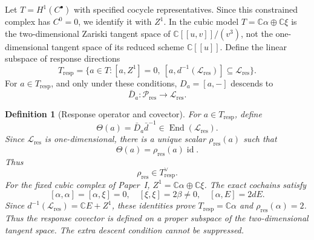 \documentclass[11pt]{amsart}
\newtheorem{definition}[theorem]{Definition}
\newcommand{\C}{\mathbb C}
\newcommand{\End}{\operatorname{End}}
\newcommand{\id}{\operatorname{id}}
\begin{document}
Let $T=H^1(C^\bullet)$ with specified cocycle representatives.
Since this constrained complex has $C^0=0$, we identify it with $Z^1$.
In the cubic model $T=\C\alpha\oplus\C\xi$ is the two-dimensional
Zariski tangent space of $\C[[u,v]]/(v^3)$, not the one-dimensional
tangent space of its reduced scheme $\C[[u]]$.
Define the linear subspace of response directions
\[
T_{\mathrm{resp}}=
\{a\in T:
[a,Z^1]=0,\ 
[a,d^{-1}(\mathcal L_{\mathrm{res}})]\subseteq\mathcal L_{\mathrm{res}}\}.
\]
For \(a\in T_{\mathrm{resp}}\), and only under these conditions, \(D_a=[a,-]\) descends to
\[
\bar D_a:\mathcal P_{\mathrm{res}}\longrightarrow\mathcal L_{\mathrm{res}}.
\]

\begin{definition}[Response operator and covector]
For \(a\in T_{\mathrm{resp}}\), define
\[
\Theta(a)=\bar D_a\bar d^{-1}
\in\End(\mathcal L_{\mathrm{res}}).
\]
Since \(\mathcal L_{\mathrm{res}}\) is one-dimensional, there is a unique scalar \(\rho_{\mathrm{res}}(a)\) such that
\[
\Theta(a)=\rho_{\mathrm{res}}(a)\id.
\]
Thus
\[
\rho_{\mathrm{res}}\in T_{\mathrm{resp}}^\vee.
\]
For the fixed cubic complex of Paper~I, \(Z^1=\C\alpha\oplus\C\xi\).
The exact cochains satisfy
\[
[\alpha,\alpha]=[\alpha,\xi]=0,\quad
[\xi,\xi]=2\beta\ne0,\quad [\alpha,E]=2dE.
\]
Since \(d^{-1}(\mathcal L_{\mathrm{res}})=\C E+Z^1\), these identities prove
\(T_{\mathrm{resp}}=\C\alpha\) and \(\rho_{\mathrm{res}}(\alpha)=2\).
Thus the response covector is defined on a proper subspace of the two-dimensional
tangent space. The extra descent condition cannot be suppressed.
\end{definition}
\end{document}
